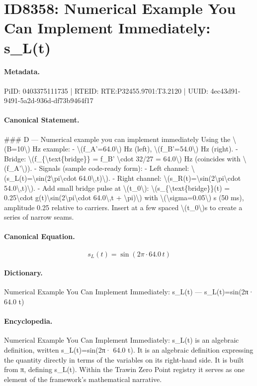 \section*{ID8358: Numerical Example You Can Implement Immediately: s\_L(t)}
\paragraph{Metadata.}
PiID: 0403375111735 | RTEID: RTE:P32455.9701:T3.2120 | UUID: 4ec43d91-9491-5a2d-936d-df73b9464f17

\paragraph{Canonical Statement.}
\#\#\# D — Numerical example you can implement immediately Using the \textbackslash{}(B=10\textbackslash{}) Hz example: - \textbackslash{}(f\_A'=64.0\textbackslash{}) Hz (left), \textbackslash{}(f\_B'=54.0\textbackslash{}) Hz (right). - Bridge: \textbackslash{}(f\_\{\textbackslash{}text\{bridge\}\} = f\_B' \textbackslash{}cdot 32/27 = 64.0\textbackslash{}) Hz (coincides with \textbackslash{}(f\_A'\textbackslash{})). - Signals (sample code-ready form): - Left channel: \textbackslash{}(s\_L(t)=\textbackslash{}sin(2\textbackslash{}pi\textbackslash{}cdot 64.0\textbackslash{},t)\textbackslash{}). - Right channel: \textbackslash{}(s\_R(t)=\textbackslash{}sin(2\textbackslash{}pi\textbackslash{}cdot 54.0\textbackslash{},t)\textbackslash{}). - Add small bridge pulse at \textbackslash{}(t\_0\textbackslash{}): \textbackslash{}(s\_\{\textbackslash{}text\{bridge\}\}(t) = 0.25\textbackslash{}cdot g(t)\textbackslash{}sin(2\textbackslash{}pi\textbackslash{}cdot 64.0\textbackslash{},t + \textbackslash{}pi)\textbackslash{}) with \textbackslash{}(\textbackslash{}sigma=0.05\textbackslash{}) s (50 ms), amplitude 0.25 relative to carriers. Insert at a few spaced \textbackslash{}(t\_0\textbackslash{})s to create a series of narrow seams.

\paragraph{Canonical Equation.}
\[
s_L(t)=\sin(2\pi\cdot 64.0\,t)
\]

\paragraph{Dictionary.}
Numerical Example You Can Implement Immediately: s\_L(t) — s\_L(t)=sin(2π· 64.0 t)

\paragraph{Encyclopedia.}
Numerical Example You Can Implement Immediately: s\_L(t) is an algebraic definition, written s\_L(t)=sin(2π· 64.0 t). It is an algebraic definition expressing the quantity directly in terms of the variables on its right-hand side. It is built from π, defining s\_L(t). Within the Trawin Zero Point registry it serves as one element of the framework's mathematical narrative.

